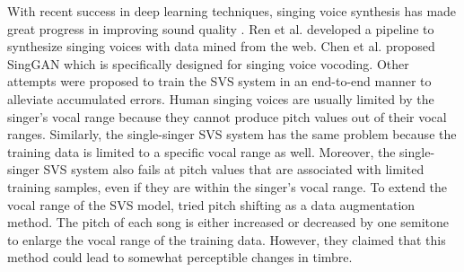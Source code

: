 With recent success in deep learning techniques, singing voice synthesis has made great progress in improving sound quality \cite{lu2020xiaoicesing,nishimura2016singing,chen2020hifisinger}.
Ren et al. \cite{ren2020deepsinger} developed a pipeline to synthesize singing voices with data mined from the web. Chen et al. \cite{huang2022singgan} proposed SingGAN which is specifically designed for singing voice vocoding. Other attempts \cite{zhang2021visinger,zhou22f_interspeech} were proposed to train the SVS system in an end-to-end manner to alleviate accumulated errors.
Human singing voices are usually limited by the singer's vocal range because they cannot produce pitch values out of their vocal ranges.
Similarly, the single-singer SVS system has the same problem because the training data is limited to a specific vocal range as well.
Moreover, the single-singer SVS system also fails at pitch values that are associated with limited training samples, even if they are within the singer's vocal range.
To extend the vocal range of the SVS model, \cite{zhang2022wesinger} tried pitch shifting as a data augmentation method. 
The pitch of each song is either increased or decreased by one semitone to enlarge the vocal range of the training data.
However, they claimed that this method could lead to somewhat perceptible changes in timbre.

